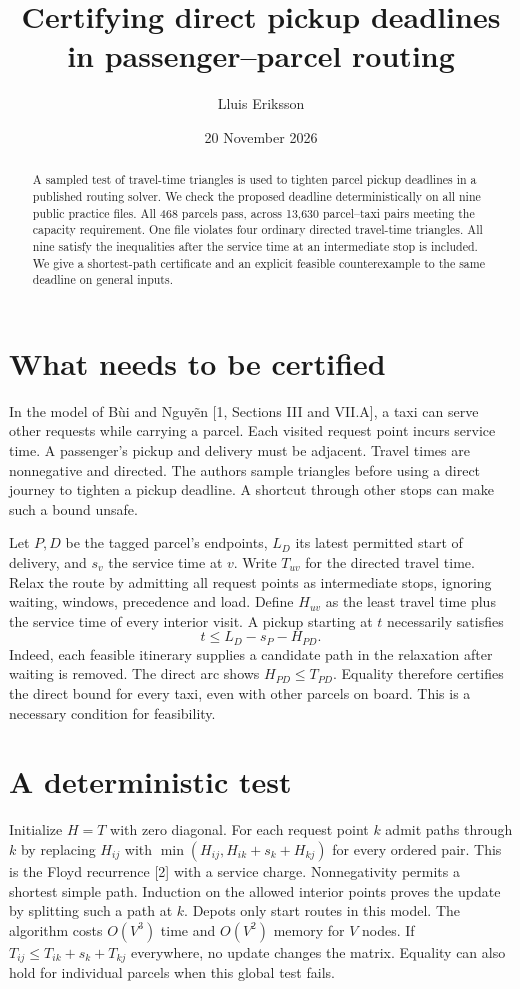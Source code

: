 \documentclass[11pt]{article}
\title{Certifying direct pickup deadlines in passenger--parcel routing}
\author{Lluis Eriksson}
\date{20 November 2026}
\begin{document}
\maketitle
\begin{abstract}
A sampled test of travel-time triangles is used to tighten parcel pickup deadlines in a published routing solver. We check the proposed deadline deterministically on all nine public practice files. All 468 parcels pass, across 13,630 parcel--taxi pairs meeting the capacity requirement. One file violates four ordinary directed travel-time triangles. All nine satisfy the inequalities after the service time at an intermediate stop is included. We give a shortest-path certificate and an explicit feasible counterexample to the same deadline on general inputs.
\end{abstract}
\section{What needs to be certified}
In the model of B\`ui and Nguy\~en [1, Sections III and VII.A], a taxi can serve other requests while carrying a parcel. Each visited request point incurs service time. A passenger's pickup and delivery must be adjacent. Travel times are nonnegative and directed. The authors sample triangles before using a direct journey to tighten a pickup deadline. A shortcut through other stops can make such a bound unsafe.

Let $P,D$ be the tagged parcel's endpoints, $L_D$ its latest permitted start of delivery, and $s_v$ the service time at $v$. Write $T_{uv}$ for the directed travel time. Relax the route by admitting all request points as intermediate stops, ignoring waiting, windows, precedence and load. Define $H_{uv}$ as the least travel time plus the service time of every interior visit. A pickup starting at $t$ necessarily satisfies
\[
 t\le L_D-s_P-H_{PD}.
\]
Indeed, each feasible itinerary supplies a candidate path in the relaxation after waiting is removed. The direct arc shows $H_{PD}\le T_{PD}$. Equality therefore certifies the direct bound for every taxi, even with other parcels on board. This is a necessary condition for feasibility.

\section{A deterministic test}
Initialize $H=T$ with zero diagonal. For each request point $k$ admit paths through $k$ by replacing $H_{ij}$ with $\min(H_{ij},H_{ik}+s_k+H_{kj})$ for every ordered pair. This is the Floyd recurrence [2] with a service charge. Nonnegativity permits a shortest simple path. Induction on the allowed interior points proves the update by splitting such a path at $k$. Depots only start routes in this model. The algorithm costs $O(V^3)$ time and $O(V^2)$ memory for $V$ nodes. If $T_{ij}\le T_{ik}+s_k+T_{kj}$ everywhere, no update changes the matrix. Equality can also hold for individual parcels when this global test fails.
\newpage
\end{document}
